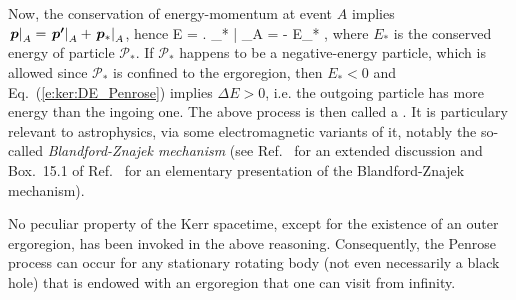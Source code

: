 Now, the conservation of energy-momentum at event $A$
implies $\left. \bm{p} \right| _{A} = \left. \bm{p'} \right| _{A} + \left. \bm{p}_* \right| _{A}$, hence
\be \label{e:ker:DE_Penrose}
    \Delta E =   \left. \w{\xi} \cdot {}_* \right| _{A} = - E_* ,
\ee
where $E_*$ is the conserved energy of particle $\mathscr{P}_*$.
If $\mathscr{P}_*$ happens to be a negative-energy particle, which is allowed since
$\mathscr{P}_*$ is confined to the ergoregion, then $E_* < 0$ and
Eq.~(\ref{e:ker:DE_Penrose}) implies $\Delta E > 0$,
i.e. the outgoing particle has more energy
than the ingoing one. The above process is then called a
.
It is particulary relevant to astrophysics, via some electromagnetic variants of it,
notably the so-called
\emph{Blandford-Znajek mechanism}
(see Ref.~\cite{LasotGATN14} for an extended discussion and Box.~15.1
of Ref.~\cite{Hartl03} for an
elementary presentation of the Blandford-Znajek mechanism).

\begin{remark}
No peculiar property of the Kerr spacetime, except for the existence of an outer
ergoregion, has been invoked in the above reasoning. Consequently, the Penrose process
can occur for any stationary rotating body (not even necessarily a black hole) that
is endowed with an ergoregion that one can visit from infinity.
\end{remark}

